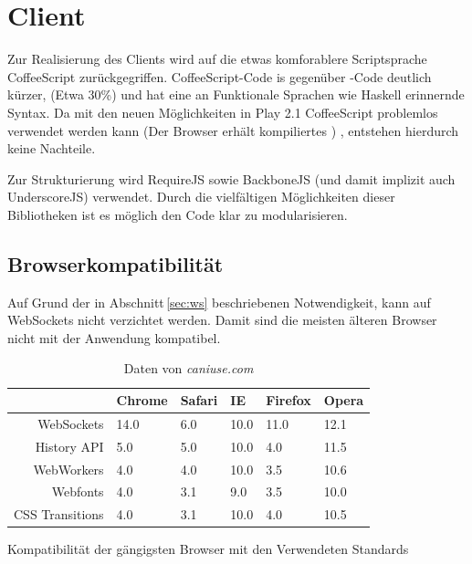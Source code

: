 \section{Client}

Zur Realisierung des Clients wird auf die etwas komforablere Scriptsprache CoffeeScript
zurückgegriffen. CoffeeScript-Code is gegenüber -Code deutlich kürzer, (Etwa 30\%) und hat
eine an Funktionale Sprachen wie Haskell erinnernde Syntax. Da mit den neuen Möglichkeiten in Play
2.1 CoffeeScript problemlos verwendet werden kann (Der Browser erhält kompiliertes ) ,
entstehen hierdurch keine Nachteile.

Zur Strukturierung wird RequireJS sowie BackboneJS (und damit implizit auch UnderscoreJS) verwendet.
Durch die vielfältigen Möglichkeiten dieser Bibliotheken ist es möglich den Code klar zu
modularisieren.

\subsection{Browserkompatibilität}
\label{sec:comp}

Auf Grund der in Abschnitt\,\ref{sec:ws} beschriebenen Notwendigkeit, kann auf WebSockets nicht
verzichtet werden. Damit sind die meisten älteren Browser nicht mit der Anwendung kompatibel.

\begin{table}[h]
\centering
\begin{tabular}{rlllll}
                  & \textbf{Chrome} & \textbf{Safari} & \textbf{IE} & \textbf{Firefox} 
                  & \textbf{Opera} \\\hline
  WebSockets      & 14.0            & 6.0             & 10.0        & 11.0             & 12.1  \\
  History API     & 5.0             & 5.0             & 10.0        & 4.0              & 11.5  \\
  WebWorkers      & 4.0             & 4.0             & 10.0        & 3.5              & 10.6  \\
  Webfonts        & 4.0             & 3.1             & 9.0         & 3.5              & 10.0  \\
  CSS Transitions & 4.0             & 3.1             & 10.0        & 4.0              & 10.5  \\  

\end{tabular}
\caption{Kompatibilität der gängigsten Browser mit den Verwendeten Standards}
  \caption*{Daten von \textit{caniuse.com}}
\label{tab:comp}
\end{table}

